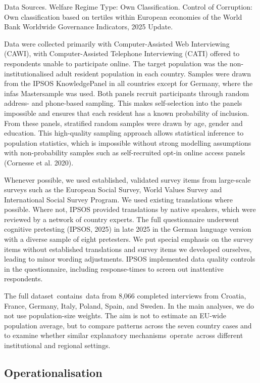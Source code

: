 \documentclass[12pt]{article}
\begin{document}
Data Sources. Welfare Regime Type: Own Classification. Control of
Corruption: Own classification based on tertiles within European
economies of the World Bank Worldwide Governance Indicators, 2025
Update.

Data were collected primarily with Computer-Assisted Web Interviewing
(CAWI), with Computer-Assisted Telephone Interviewing (CATI) offered to
respondents unable to participate online. The target population was the
non-institutionalised adult resident population in each country. Samples
were drawn from the IPSOS KnowledgePanel in all countries except for
Germany, where the infas Mastersample was used. Both panels recruit
participants through random address- and phone-based sampling. This
makes self-selection into the panels impossible and ensures that each
resident has a known probability of inclusion. From these panels,
stratified random samples were drawn by age, gender and education. This
high-quality sampling approach allows statistical inference to
population statistics, which is impossible without strong modelling
assumptions with non-probability samples such as self-recruited opt-in
online access panels (Cornesse et al. 2020).

Whenever possible, we used established, validated survey items from
large-scale surveys such as the European Social Survey, World Values
Survey and International Social Survey Program. We used existing translations where
possible. Where not, IPSOS provided translations by native speakers,
which were reviewed by a network of country experts. The full
questionnaire underwent cognitive pretesting (IPSOS, 2025) in late 2025
in the German language version with a diverse sample of eight
pretesters. We put special emphasis on the survey items without
established translations and survey items we developed ourselves,
leading to minor wording adjustments. IPSOS implemented data quality
controls in the questionnaire, including response-times to screen out
inattentive respondents.

The full dataset~contains~data from 8,066 completed interviews from
Croatia, France, Germany, Italy, Poland, Spain, and Sweden. In the main
analyses, we do not use population-size weights. The aim is not to
estimate an EU-wide population average, but to compare patterns across
the seven country cases and to examine whether similar explanatory
mechanisms~operate~across different institutional and regional
settings.~

\subsection{Operationalisation}\label{operationalisation}
\end{document}
